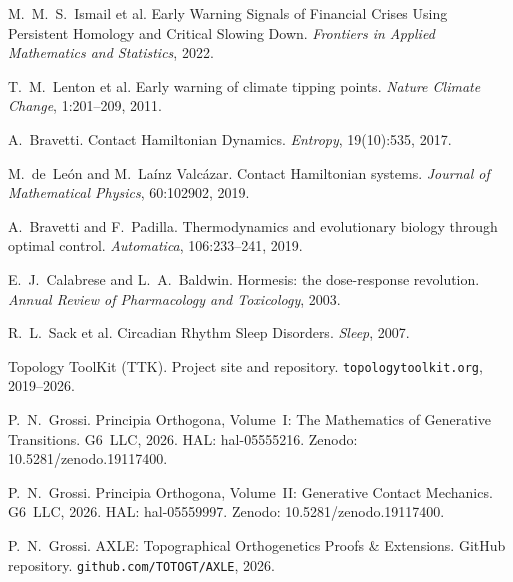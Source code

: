 \documentclass[12pt, oneside]{book}
\theoremstyle{plain}
\theoremstyle{definition}
\theoremstyle{remark}
\begin{document}
\begin{enumerate}[label={[\arabic*]}]

  \item M.~M.~S.~Ismail et al. Early Warning Signals of
    Financial Crises Using Persistent Homology and Critical
    Slowing Down. \textit{Frontiers in Applied Mathematics
    and Statistics}, 2022.

  \item T.~M.~Lenton et al. Early warning of climate tipping
    points. \textit{Nature Climate Change}, 1:201--209, 2011.

  \item A.~Bravetti. Contact Hamiltonian Dynamics.
    \textit{Entropy}, 19(10):535, 2017.

  \item M.~de~Le\'on and M.~La\'inz Valc\'azar. Contact
    Hamiltonian systems. \textit{Journal of Mathematical
    Physics}, 60:102902, 2019.

  \item A.~Bravetti and F.~Padilla. Thermodynamics and
    evolutionary biology through optimal control.
    \textit{Automatica}, 106:233--241, 2019.

  \item E.~J.~Calabrese and L.~A.~Baldwin. Hormesis: the
    dose-response revolution. \textit{Annual Review of
    Pharmacology and Toxicology}, 2003.

  \item R.~L.~Sack et al. Circadian Rhythm Sleep Disorders.
    \textit{Sleep}, 2007.

  \item Topology ToolKit (TTK). Project site and repository.
    \texttt{topologytoolkit.org}, 2019--2026.

  \item P.~N.~Grossi. Principia Orthogona, Volume~I:
    The Mathematics of Generative Transitions. G6~LLC, 2026.
    HAL: hal-05555216. Zenodo: 10.5281/zenodo.19117400.

  \item P.~N.~Grossi. Principia Orthogona, Volume~II:
    Generative Contact Mechanics. G6~LLC, 2026.
    HAL: hal-05559997. Zenodo: 10.5281/zenodo.19117400.

  \item P.~N.~Grossi. AXLE: Topographical Orthogenetics
    Proofs \& Extensions. GitHub repository.
    \texttt{github.com/TOTOGT/AXLE}, 2026.

\end{enumerate}
\end{document}
